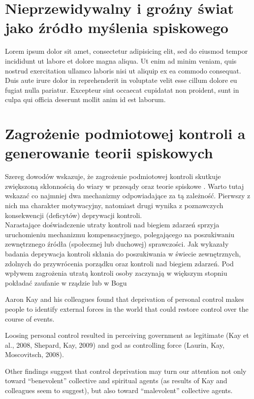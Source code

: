 \documentclass[man]{apa6}
\begin{document}
    \section{Nieprzewidywalny i groźny świat jako źródło myślenia spiskowego}

    Lorem ipsum dolor sit amet, consectetur adipisicing elit, sed do eiusmod tempor incididunt ut labore et dolore magna aliqua. Ut enim ad minim veniam, quis nostrud exercitation ullamco laboris nisi ut aliquip ex ea commodo consequat. Duis aute irure dolor in reprehenderit in voluptate velit esse cillum dolore eu fugiat nulla pariatur. Excepteur sint occaecat cupidatat non proident, sunt in culpa qui officia deserunt mollit anim id est laborum.

    \section{Zagrożenie podmiotowej kontroli a generowanie teorii spiskowych}

    Szereg dowodów wskazuje, że zagrożenie podmiotowej kontroli skutkuje zwiększoną skłonnością do wiary w przesądy oraz teorie spiskowe \parencite{whitson2008lacking}. Warto tutaj wskazać co najmniej dwa mechanizmy odpowiadające za tą zależność. Pierwszy z nich ma charakter motywacyjny, natomiast drugi wynika z poznawczych konsekwencji (deficytów) deprywacji kontroli.\\

    Narastające doświadczenie utraty kontroli nad biegiem zdarzeń sprzyja uruchomieniu mechanizmu kompensacyjnego, polegającego na poszukiwaniu zewnętrznego źródła (społecznej lub duchowej) sprawczości. Jak wykazały badania \textcite{kay2008god} deprywacja kontroli skłania do poszukiwania w świecie zewnętrznych, zdolnych do przywrócenia porządku oraz kontroli nad biegiem zdarzeń. Pod wpływem zagrożenia utratą kontroli osoby zaczynają w większym stopniu pokładać zaufanie w rządzie lub w Bogu

Aaron Kay and his colleagues found that deprivation of personal control makes people to identify external forces in the world that could restore control over the course of events.

Loosing personal control resulted in perceiving government as legitimate (Kay et al., 2008, Shepard, Kay, 2009) and god as controlling force (Laurin, Kay, Moscovitsch, 2008).

Other findings suggest that control deprivation may turn our attention not only toward ``benevolent'' collective and spiritual agents (as results of Kay and colleagues seem to suggest), but also toward ``malevolent'' collective agents.
\end{document}
